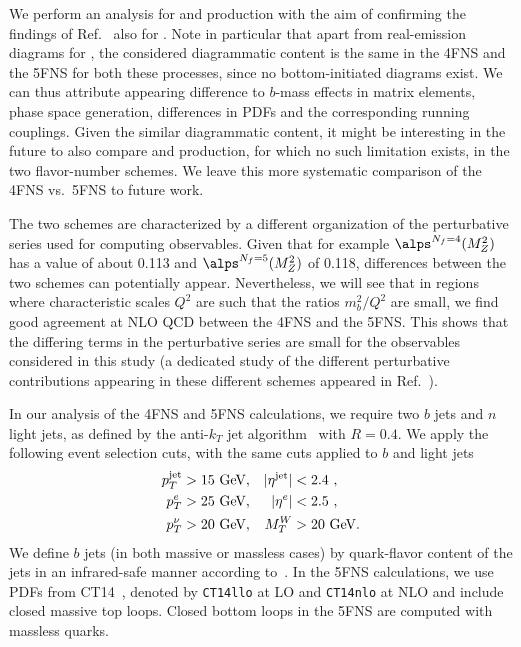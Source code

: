 We perform an analysis for \Wbb{} and \Wbbnj[1]{} production with the aim
of confirming the findings of Ref.~\cite{FebresCordero:2006sj} also
for \Wbbnj[1]{}. Note in particular that apart from real-emission diagrams
for \Wbbnj[1]{}, the considered diagrammatic content is the same in the
4FNS and the 5FNS for both these processes, since no bottom-initiated
diagrams exist. We can thus attribute appearing difference to $b$-mass effects in matrix elements, phase space generation, differences in PDFs and the corresponding running couplings. Given the similar diagrammatic content, it might be interesting in the future to also compare \Wbbnj[2]{}
and \Wbbnj[3]{} production, for which no such
limitation exists, in the two flavor-number schemes. We leave this
more systematic comparison of the 4FNS vs.~5FNS to future work.

The two schemes are characterized by a different organization of the
perturbative series used for computing observables. Given that for
example $\alps^{N_f=4}(M_Z^2)$ has a value of about 0.113 and
$\alps^{N_f=5}(M_Z^2)$ of 0.118, differences between the two
schemes can potentially appear. Nevertheless, we will see that in regions where characteristic scales $Q^2$ are such that the ratios
$m_b^2/Q^2$ are small, we find good agreement at NLO QCD between the
4FNS and the 5FNS. This shows that the differing terms in the perturbative series are small for the
observables considered in this study (a dedicated study of the different
perturbative contributions appearing in these different schemes appeared in
Ref.~\cite{Maltoni:2012pa}).

In our analysis of the 4FNS and 5FNS calculations, we require two $b$ jets and $n$ light jets, as defined by the anti-$k_T$ jet
algorithm~\cite{antikT} with $R=0.4$. We apply the following event
selection cuts, with the same cuts applied to $b$ and light jets
\begin{align}
  p_T^{\text{jet}}&>15\text{ GeV},& |\eta^{\text{jet}}|&<2.4\ ,\notag\\
  p_T^{e}&>25\text{ GeV},& |\eta^{e}|&<2.5\ ,\notag\\
  p_T^{\nu}&>20\text{ GeV},& M_T^W &> 20\text{ GeV}.
  \label{eq:massivemasslessCuts}
\end{align}
We define $b$ jets (in both massive or massless cases) by
quark-flavor content of the jets in an infrared-safe manner according
to~\cite{Banfi:2006hf}. In the 5FNS calculations,
we use PDFs from CT14~\cite{CT14}, denoted by \texttt{CT14llo} at LO and
\texttt{CT14nlo} at NLO and include closed massive top loops. Closed bottom
loops in the 5FNS are computed with massless quarks.

